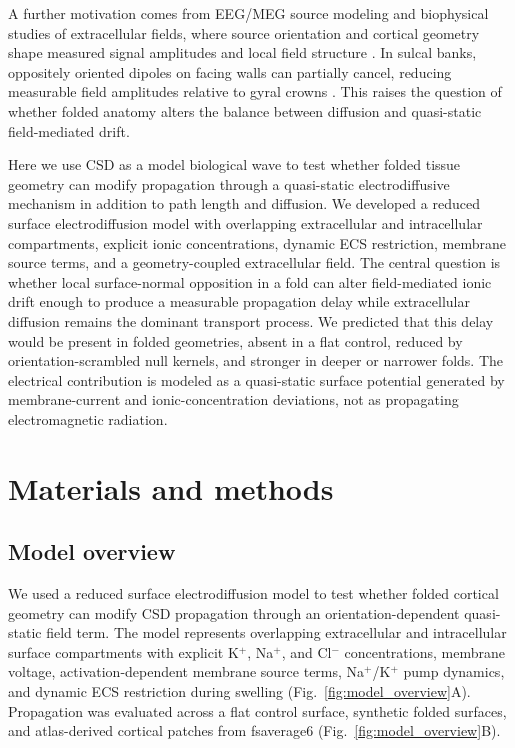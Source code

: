 \documentclass[12pt]{article}
\begin{document}
A further motivation comes from EEG/MEG source modeling and biophysical studies of extracellular fields, where source orientation and cortical geometry shape measured signal amplitudes and local field structure \citep{Kirschstein_2009,Ahlfors2010a,Ahlfors2010b,Reimann2013}. In sulcal banks, oppositely oriented dipoles on facing walls can partially cancel, reducing measurable field amplitudes relative to gyral crowns \citep{Kirschstein_2009}. This raises the question of whether folded anatomy alters the balance between diffusion and quasi-static field-mediated drift.

Here we use CSD as a model biological wave to test whether folded tissue geometry can modify propagation through a quasi-static electrodiffusive mechanism in addition to path length and diffusion. We developed a reduced surface electrodiffusion model with overlapping extracellular and intracellular compartments, explicit ionic concentrations, dynamic ECS restriction, membrane source terms, and a geometry-coupled extracellular field. The central question is whether local surface-normal opposition in a fold can alter field-mediated ionic drift enough to produce a measurable propagation delay while extracellular diffusion remains the dominant transport process. We predicted that this delay would be present in folded geometries, absent in a flat control, reduced by orientation-scrambled null kernels, and stronger in deeper or narrower folds. The electrical contribution is modeled as a quasi-static surface potential generated by membrane-current and ionic-concentration deviations, not as propagating electromagnetic radiation.

\section{Materials and methods}

\subsection{Model overview}

We used a reduced surface electrodiffusion model to test whether folded cortical geometry can modify CSD propagation through an orientation-dependent quasi-static field term. The model represents overlapping extracellular and intracellular surface compartments with explicit K$^+$, Na$^+$, and Cl$^-$ concentrations, membrane voltage, activation-dependent membrane source terms, Na$^+$/K$^+$ pump dynamics, and dynamic ECS restriction during swelling (Fig.~\ref{fig:model_overview}A). Propagation was evaluated across a flat control surface, synthetic folded surfaces, and atlas-derived cortical patches from fsaverage6
(Fig.~\ref{fig:model_overview}B).
\end{document}
